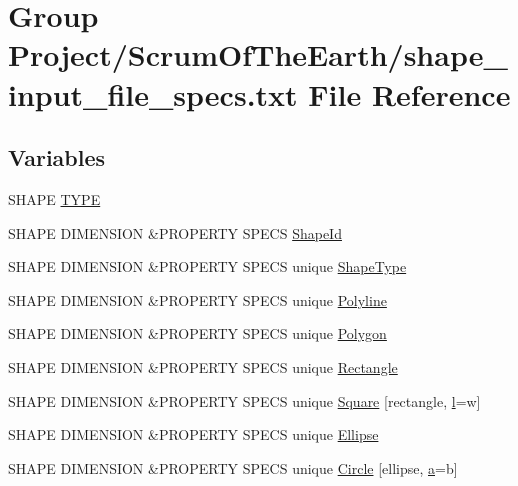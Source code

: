 \hypertarget{shape__input__file__specs_8txt}{}\section{Group Project/\+Scrum\+Of\+The\+Earth/shape\+\_\+input\+\_\+file\+\_\+specs.txt File Reference}
\label{shape__input__file__specs_8txt}
\subsection*{Variables}
\begin{DoxyCompactItemize}
\item 
S\+H\+A\+PE \hyperlink{shape__input__file__specs_8txt_a4846c923b7033536e65792b7e6d2040b}{T\+Y\+PE}
\item 
S\+H\+A\+PE D\+I\+M\+E\+N\+S\+I\+ON \&P\+R\+O\+P\+E\+R\+TY S\+P\+E\+CS \hyperlink{shape__input__file__specs_8txt_a467b0c8874f7e5c808ddbfae7144d412}{Shape\+Id}
\item 
S\+H\+A\+PE D\+I\+M\+E\+N\+S\+I\+ON \&P\+R\+O\+P\+E\+R\+TY S\+P\+E\+CS unique \hyperlink{shape__input__file__specs_8txt_a76cb42f46f7adc2fe2ae77fd213e21e1}{Shape\+Type}
\item 
S\+H\+A\+PE D\+I\+M\+E\+N\+S\+I\+ON \&P\+R\+O\+P\+E\+R\+TY S\+P\+E\+CS unique \hyperlink{shape__input__file__specs_8txt_a7f7aae76d6fc1caf3d692a8b6bb9a9b7}{Polyline}
\item 
S\+H\+A\+PE D\+I\+M\+E\+N\+S\+I\+ON \&P\+R\+O\+P\+E\+R\+TY S\+P\+E\+CS unique \hyperlink{shape__input__file__specs_8txt_a04e906b8dbbb27ddcde493daa87543f4}{Polygon}
\item 
S\+H\+A\+PE D\+I\+M\+E\+N\+S\+I\+ON \&P\+R\+O\+P\+E\+R\+TY S\+P\+E\+CS unique \hyperlink{shape__input__file__specs_8txt_abd9fcf84705ffbf8fa1f2c58d3938cb6}{Rectangle}
\item 
S\+H\+A\+PE D\+I\+M\+E\+N\+S\+I\+ON \&P\+R\+O\+P\+E\+R\+TY S\+P\+E\+CS unique \hyperlink{shape__input__file__specs_8txt_ad077d50a4f33b6bb8f3d3b5f14c196fd}{Square} \mbox{[}rectangle, \hyperlink{shape__input__file__specs_8txt_a2e02238fe11bc76d2a69c565c7391545}{l}=w\mbox{]}
\item 
S\+H\+A\+PE D\+I\+M\+E\+N\+S\+I\+ON \&P\+R\+O\+P\+E\+R\+TY S\+P\+E\+CS unique \hyperlink{shape__input__file__specs_8txt_a0d2a35a3e8361f31d6ad940ea7b1864c}{Ellipse}
\item 
S\+H\+A\+PE D\+I\+M\+E\+N\+S\+I\+ON \&P\+R\+O\+P\+E\+R\+TY S\+P\+E\+CS unique \hyperlink{shape__input__file__specs_8txt_af42de4b736c5bed215a1faf053c5ef86}{Circle} \mbox{[}ellipse, \hyperlink{shape__input__file__specs_8txt_ae28cf074afc52317b2105a81fa268a8c}{a}=b\mbox{]}

\end{DoxyCompactItemize}
